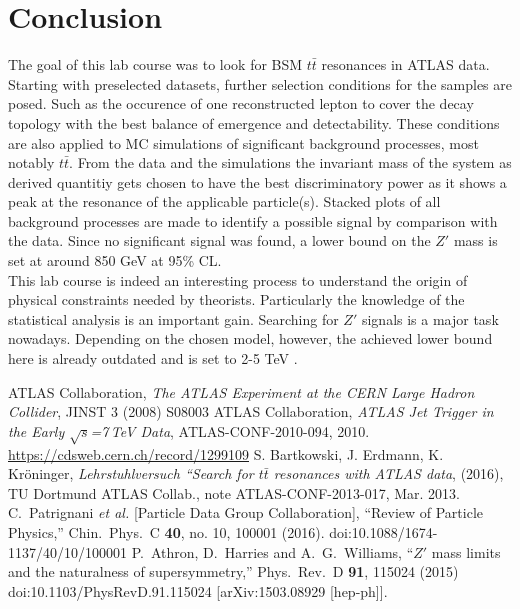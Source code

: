 \section{Conclusion}
The goal of this lab course was to look for BSM $t\bar t$ resonances in ATLAS data. Starting with preselected datasets, further selection conditions 
for the samples are posed. Such as the occurence of one reconstructed lepton to cover the decay topology with the best balance of emergence and
detectability. These conditions are also applied to MC simulations of significant background processes, most notably $t\bar t$. From the data and
the simulations the invariant mass of the system as derived quantitiy gets chosen to have the best discriminatory power as it shows a peak at 
the resonance of the applicable particle(s). Stacked plots of all background processes are made to identify a possible signal by comparison with
the data. Since no significant signal was found, a lower bound on the $Z'$ mass is set at around 850 GeV at 95\% CL.\\
\noindent This lab course is indeed an interesting process to understand the origin of physical constraints needed by theorists. Particularly the 
knowledge of the statistical analysis is an important gain.
Searching for $Z'$ signals is a major task nowadays. Depending on the chosen
model, however, the achieved lower bound here is already outdated and is set to 2-5 TeV \cite{Atlaslimits}\cite{pdg}\cite{1503.08929}.

\newpage
 \begin{thebibliography}{WissOnl}
  ATLAS Collaboration, \textit{The ATLAS Experiment at the CERN Large Hadron Collider}, JINST 3 (2008) S08003
  ATLAS Collaboration, \textit{ATLAS Jet Trigger in the Early $\sqrt{s}$=7\,TeV Data}, ATLAS-CONF-2010-094, 2010. \href{https://cdsweb.cern.ch/record/1299109}{https://cdsweb.cern.ch/record/1299109}
  S. Bartkowski, J. Erdmann, K. Kröninger, \textit{Lehrstuhlversuch ``Search for $t\bar t$ resonances with ATLAS data}, (2016), TU Dortmund
  ATLAS Collab., note ATLAS-CONF-2013-017, Mar. 2013.
    C.~Patrignani {\it et al.} [Particle Data Group Collaboration],
 ``Review of Particle Physics,''
  Chin.\ Phys.\ C {\bf 40}, no. 10, 100001 (2016).
  doi:10.1088/1674-1137/40/10/100001
   P.~Athron, D.~Harries and A.~G.~Williams,
  ``$Z'$ mass limits and the naturalness of supersymmetry,''
  Phys.\ Rev.\ D {\bf 91}, 115024 (2015)
  doi:10.1103/PhysRevD.91.115024
  [arXiv:1503.08929 [hep-ph]].
 \end{thebibliography}




